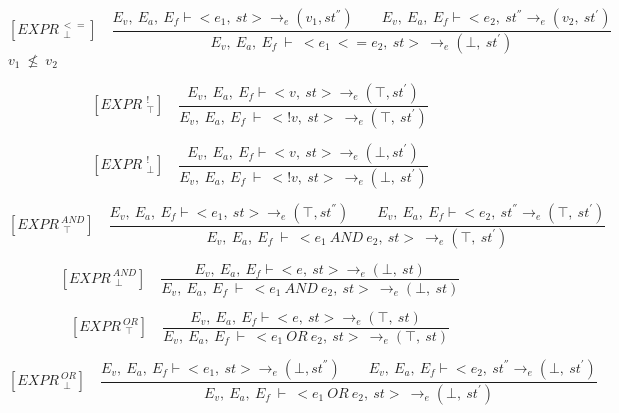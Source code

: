    	\[
   	[EXPR^{\ <=}_{\ \ \bot}] \quad
   	\dfrac{E_v, \ E_a, \ E_f \vdash <e_1, \ st> \rightarrow_e (v_1, st^{''}) \qquad E_v, \ E_a, \ E_f \vdash <e_2, \ st^{''} \rightarrow_e (v_2, \ st^{'})}{E_v, \ E_a, \ E_f \ \vdash \ <e_1 \ <= e_2, \ st> \ \rightarrow_e (\bot, \ st^{'})}
   	\]
	\begin{math}
   	v_1 \ \nleq \ v_2
   	\end{math}
   	
   	\[
   	[EXPR^{\ \ !}_{\ \ \top}] \quad
   	\dfrac{E_v, \ E_a, \ E_f \vdash <v, \ st> \rightarrow_e (\top, st^{'})}{E_v, \ E_a, \ E_f \ \vdash \ <!v, \ st> \ \rightarrow_e (\top, \ st^{'})}
   	\]  	  	

   	\[
   	[EXPR^{\ \ !}_{\ \ \bot}] \quad
   	\dfrac{E_v, \ E_a, \ E_f \vdash <v, \ st> \rightarrow_e (\bot, st^{'})}{E_v, \ E_a, \ E_f \ \vdash \ <!v, \ st> \ \rightarrow_e (\bot, \ st^{'})}
   	\]
   	
   	
   	\[
   	[EXPR^{\ AND}_{\ \ \top}] \quad
   	\dfrac{E_v, \ E_a, \ E_f \vdash <e_1, \ st> \rightarrow_e (\top, st^{''}) \qquad E_v, \ E_a, \ E_f \vdash <e_2, \ st^{''} \rightarrow_e (\top, \ st^{'})}{E_v, \ E_a, \ E_f \ \vdash \ <e_1 \ AND \ e_2, \ st> \ \rightarrow_e (\top, \ st^{'})}
   	\]  	
   	
   	\[
   	[EXPR^{\ AND}_{\ \ \bot}] \quad
   	\dfrac{E_v, \ E_a, \ E_f \vdash <e, \ st> \rightarrow_e (\bot, \ st) }{E_v, \ E_a, \ E_f \ \vdash \ <e_1 \ AND \ e_2, \ st> \ \rightarrow_e (\bot, \ st)}
   	\]
   	
   	
   	\[
   	[EXPR^{\ OR}_{\ \ \top}] \quad
   	\dfrac{E_v, \ E_a, \ E_f \vdash <e, \ st> \rightarrow_e (\top, \ st) }{E_v, \ E_a, \ E_f \ \vdash \ <e_1 \ OR \ e_2, \ st> \ \rightarrow_e (\top, \ st)}
   	\]
   	
   	\[
   	[EXPR^{\ OR}_{\ \ \bot}] \quad
   	\dfrac{E_v, \ E_a, \ E_f \vdash <e_1, \ st> \rightarrow_e (\bot, st^{''}) \qquad E_v, \ E_a, \ E_f \vdash <e_2, \ st^{''} \rightarrow_e (\bot, \ st^{'})}{E_v, \ E_a, \ E_f \ \vdash \ <e_1 \ OR \ e_2, \ st> \ \rightarrow_e (\bot, \ st^{'})}
   	\]  	
   	
   	